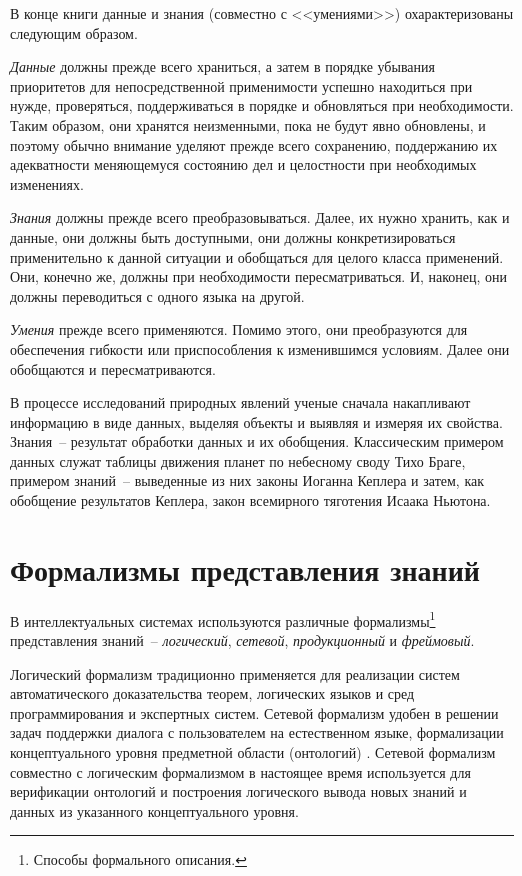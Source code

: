 \documentclass[a4paper,14pt, openany, twoside, final]{extbook} %
\begin{document}
В конце книги \cite{DDWII} данные и знания (совместно с <<умениями>>) охарактеризованы следующим образом.

{\em Данные} должны прежде всего храниться, а затем в порядке убывания приоритетов для непосредственной применимости успешно находиться при нужде, проверяться, поддерживаться в порядке и обновляться при необходимости. Таким образом, они хранятся неизменными, пока не будут явно обновлены, и поэтому обычно внимание уделяют прежде всего сохранению, поддержанию их адекватности меняющемуся состоянию дел и целостности при необходимых изменениях.

{\em Знания} должны прежде всего преобразовываться. Далее, их нужно хранить, как и данные, они должны быть доступными, они должны конкретизироваться применительно к данной ситуации и обобщаться для целого класса применений. Они, конечно же, должны при необходимости пересматриваться. И, наконец, они должны переводиться с одного языка на другой.

{\em Умения} прежде всего применяются. Помимо этого, они преобразуются для обеспечения гибкости или приспособления к изменившимся условиям. Далее они обобщаются и пересматриваются.

В процессе исследований природных явлений ученые сначала накапливают информацию в виде данных, выделяя объекты и выявляя и измеряя их свойства.  Знания~-- результат обработки данных и их обобщения.  Классическим примером данных служат таблицы движения планет по небесному своду Тихо Браге, примером знаний~-- выведенные из них законы Иоганна Кеплера и затем, как обобщение результатов Кеплера, закон всемирного тяготения Исаака Ньютона.\enlargethispage{-3.5em}

\section{Формализмы представления знаний}
\label{sec:knowlege_repr}

В интеллектуальных системах используются различные формализмы\footnote{Способы формального описания.} представления знаний~-- {\em логический}, {\em сетевой}, {\em продукционный} и {\em фреймовый}.

Логический формализм традиционно применяется для реализации систем автоматического доказательства теорем, логических языков и сред программирования и экспертных систем.  Сетевой формализм удобен в решении задач поддержки диалога с пользователем на естественном языке, формализации концептуального уровня предметной области (онтологий) \cite{ontodef}.  Сетевой формализм совместно с логическим формализмом в настоящее время используется для верификации онтологий и построения логического вывода новых знаний и данных из указанного концептуального уровня.
\end{document}
